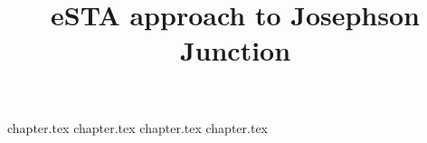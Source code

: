 \documentclass{article}
\title{eSTA approach to Josephson Junction}
\date{}
\author{}
\begin{document}

\maketitle

{chapter.tex}
{chapter.tex}
{chapter.tex}
\newpage
{chapter.tex}

\end{document}
